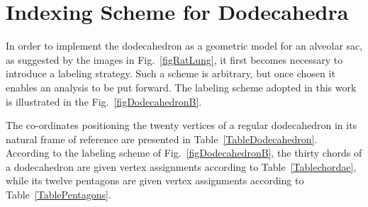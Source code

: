 \section{Indexing Scheme for Dodecahedra}
\label{sec:indexingDodecahedra}

In order to implement the dodecahedron as a geometric model for an alveolar sac, as suggested by the images in Fig.~\ref{figRatLung}, it first becomes necessary to introduce a labeling strategy. Such a scheme is arbitrary, but once chosen it enables an analysis to be put forward.  The labeling scheme adopted in this work is illustrated in the Fig.~\ref{figDodecahedronB}. 
  
The co-ordinates positioning the twenty vertices of a regular dodecahedron in its natural frame of reference are presented in Table~\ref{TableDodecahedron}.  According to the labeling scheme of Fig.~\ref{figDodecahedronB}, the thirty chords of a dodecahedron are given vertex assignments according to Table~\ref{Tablechordae}, while its twelve pentagons are given vertex assignments according to Table~\ref{TablePentagons}.

